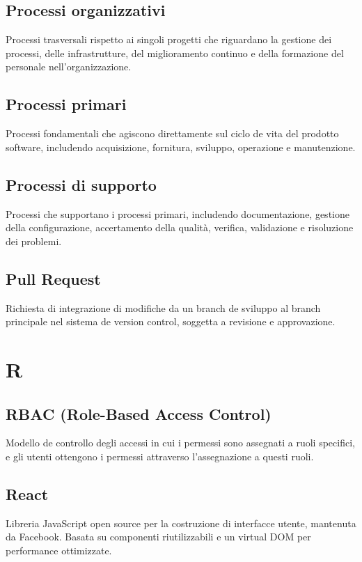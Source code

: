 \documentclass[a4paper,11pt]{article}
\begin{document}
\subsection{Processi organizzativi}
Processi trasversali rispetto ai singoli progetti che riguardano la gestione dei processi, delle infrastrutture, del miglioramento continuo e della formazione del personale nell'organizzazione.

\subsection{Processi primari}
Processi fondamentali che agiscono direttamente sul ciclo de vita del prodotto software, includendo acquisizione, fornitura, sviluppo, operazione e manutenzione.

\subsection{Processi di supporto}
Processi che supportano i processi primari, includendo documentazione, gestione della configurazione, accertamento della qualità, verifica, validazione e risoluzione dei problemi.

\subsection{Pull Request}
Richiesta di integrazione di modifiche da un branch de sviluppo al branch principale nel sistema de version control, soggetta a revisione e approvazione.

\newpage
\section{R}

\subsection{RBAC (Role-Based Access Control)}
Modello de controllo degli accessi in cui i permessi sono assegnati a ruoli specifici, e gli utenti ottengono i permessi attraverso l'assegnazione a questi ruoli.

\subsection{React}
Libreria JavaScript open source per la costruzione di interfacce utente, mantenuta da Facebook. Basata su componenti riutilizzabili e un virtual DOM per performance ottimizzate.
\end{document}
